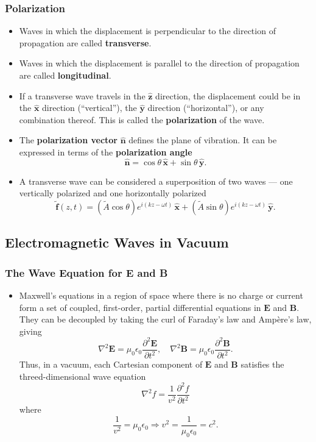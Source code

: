 \documentclass{article}
\renewcommand{\vec}[1]{\boldsymbol{\mathbf{#1}}}
\newcommand{\tvec}[1]{\tilde{\vec{#1}}}
\newcommand{\uvec}[1]{\hat{\vec{#1}}}
\begin{document}
\subsubsection{Polarization}

\begin{itemize}
  \item Waves in which the displacement is perpendicular to the direction of propagation are called \textbf{transverse}.

  \item Waves in which the displacement is parallel to the direction of propagation are called \textbf{longitudinal}.

  \item If a transverse wave travels in the $\uvec{z}$ direction, the displacement could be in the $\uvec{x}$ direction (``vertical''), the $\uvec{y}$ direction (``horizontal''), or any combination thereof. This is called the \textbf{polarization} of the wave.

  \item The \textbf{polarization vector} $\uvec{n}$ defines the plane of vibration. It can be expressed in terms of the \textbf{polarization angle} \[\uvec{n} = \cos \theta \,\uvec{x} + \sin \theta \,\uvec{y}.\]

  \item A transverse wave can be considered a superposition of two waves — one vertically polarized and one horizontally polarized \[\tvec{f}(z, t) = (\tilde{A} \cos \theta) e^{i (k z - \omega t)} \,\uvec{x} + (\tilde{A} \sin \theta) e^{i (k z - \omega t)} \,\uvec{y}.\]
\end{itemize}

\subsection{Electromagnetic Waves in Vacuum}

\subsubsection{The Wave Equation for E and B}

\begin{itemize}
  \item Maxwell's equations in a region of space where there is no charge or current form a set of coupled, first-order, partial differential equations in $\vec{E}$ and $\vec{B}$. They can be decoupled by taking the curl of Faraday's law and Ampère's law, giving \[\nabla^2 \vec{E} = \mu_0 \epsilon_0 \frac{\partial^2 \vec{E}}{\partial t^2}, \quad \nabla^2 \vec{B} = \mu_0 \epsilon_0 \frac{\partial^2 \vec{B}}{\partial t^2}.\] Thus, in a vacuum, each Cartesian component of $\vec{E}$ and $\vec{B}$ satisfies the threed-dimensional wave equation \[\nabla^2 f = \frac{1}{v^2} \frac{\partial^2 f}{\partial t^2}\] where \[\frac{1}{v^2} = \mu_0 \epsilon_0 \Rightarrow v^2 = \frac{1}{\mu_0 \epsilon_0} = c^2.\]
\end{itemize}
\end{document}
